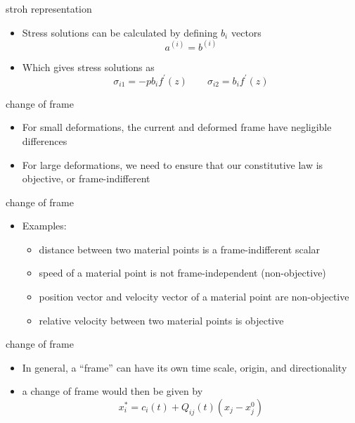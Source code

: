 \documentclass[
  letterpaper,
  ignorenonframetext,
  aspectratio=43,
  handout,
  12pt]{beamer}
\providecommand{\tightlist}{%
  \setlength{\itemsep}{0pt}\setlength{\parskip}{0pt}}
\providecommand{\tightlist}{%
\setlength{\itemsep}{0pt}\setlength{\parskip}{0pt}}
\begin{document}
\begin{frame}{stroh representation}
\protect\hypertarget{stroh-representation-6}{}
\begin{itemize}
\item
  Stress solutions can be calculated by defining \(b_i\) vectors
  \[a^{(i)} = b^{(i)}\]
\item
  Which gives stress solutions as
  \[\sigma_{i1} = -pb_if^\prime(z) \qquad \sigma_{i2} = b_i f^\prime(z)\]
\end{itemize}
\end{frame}

\begin{frame}{change of frame}
\protect\hypertarget{change-of-frame}{}
\begin{itemize}
\tightlist
\item
  For small deformations, the current and deformed frame have negligible
  differences
\item
  For large deformations, we need to ensure that our constitutive law is
  objective, or frame-indifferent
\end{itemize}
\end{frame}

\begin{frame}{change of frame}
\protect\hypertarget{change-of-frame-1}{}
\begin{itemize}
\tightlist
\item
  Examples:

  \begin{itemize}
  \tightlist
  \item
    distance between two material points is a frame-indifferent scalar
  \item
    speed of a material point is not frame-independent (non-objective)
  \item
    position vector and velocity vector of a material point are
    non-objective
  \item
    relative velocity between two material points is objective
  \end{itemize}
\end{itemize}
\end{frame}

\begin{frame}{change of frame}
\protect\hypertarget{change-of-frame-2}{}
\begin{itemize}
\tightlist
\item
  In general, a ``frame'' can have its own time scale, origin, and
  directionality
\item
  a change of frame would then be given by
  \[x_i^* = c_i(t) + Q_{ij}(t)(x_j-x^{0}_j)\]
\end{itemize}
\end{frame}
\end{document}
